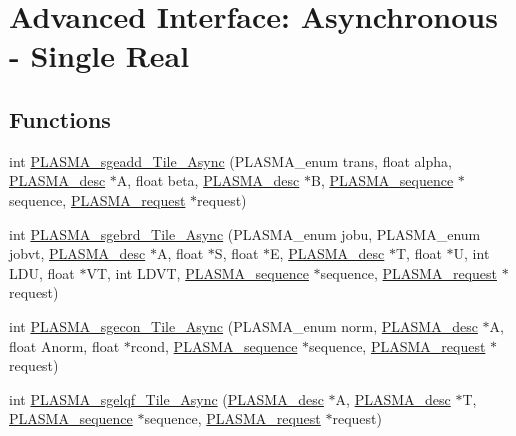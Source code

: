 \hypertarget{group__float__Tile__Async}{}\section{Advanced Interface\+: Asynchronous -\/ Single Real}
\label{group__float__Tile__Async}
\subsection*{Functions}
\begin{DoxyCompactItemize}
\item 
int \hyperlink{group__float__Tile__Async_gad88d429c19e2aec73ceda561df4666dd_gad88d429c19e2aec73ceda561df4666dd}{P\+L\+A\+S\+M\+A\+\_\+sgeadd\+\_\+\+Tile\+\_\+\+Async} (P\+L\+A\+S\+M\+A\+\_\+enum trans, float alpha, \hyperlink{structplasma__desc__t}{P\+L\+A\+S\+M\+A\+\_\+desc} $\ast$A, float beta, \hyperlink{structplasma__desc__t}{P\+L\+A\+S\+M\+A\+\_\+desc} $\ast$B, \hyperlink{structplasma__sequence__t}{P\+L\+A\+S\+M\+A\+\_\+sequence} $\ast$sequence, \hyperlink{structplasma__request__t}{P\+L\+A\+S\+M\+A\+\_\+request} $\ast$request)
\item 
int \hyperlink{group__float__Tile__Async_gae67c2111c450820663dc20c933c2703f_gae67c2111c450820663dc20c933c2703f}{P\+L\+A\+S\+M\+A\+\_\+sgebrd\+\_\+\+Tile\+\_\+\+Async} (P\+L\+A\+S\+M\+A\+\_\+enum jobu, P\+L\+A\+S\+M\+A\+\_\+enum jobvt, \hyperlink{structplasma__desc__t}{P\+L\+A\+S\+M\+A\+\_\+desc} $\ast$A, float $\ast$S, float $\ast$E, \hyperlink{structplasma__desc__t}{P\+L\+A\+S\+M\+A\+\_\+desc} $\ast$T, float $\ast$U, int L\+D\+U, float $\ast$V\+T, int L\+D\+V\+T, \hyperlink{structplasma__sequence__t}{P\+L\+A\+S\+M\+A\+\_\+sequence} $\ast$sequence, \hyperlink{structplasma__request__t}{P\+L\+A\+S\+M\+A\+\_\+request} $\ast$request)
\item 
int \hyperlink{group__float__Tile__Async_gaaa8291aabe6b837154fba55481a8fdd1_gaaa8291aabe6b837154fba55481a8fdd1}{P\+L\+A\+S\+M\+A\+\_\+sgecon\+\_\+\+Tile\+\_\+\+Async} (P\+L\+A\+S\+M\+A\+\_\+enum norm, \hyperlink{structplasma__desc__t}{P\+L\+A\+S\+M\+A\+\_\+desc} $\ast$A, float Anorm, float $\ast$rcond, \hyperlink{structplasma__sequence__t}{P\+L\+A\+S\+M\+A\+\_\+sequence} $\ast$sequence, \hyperlink{structplasma__request__t}{P\+L\+A\+S\+M\+A\+\_\+request} $\ast$request)
\item 
int \hyperlink{group__float__Tile__Async_ga66c68c7a249b7528c5cf086a44f27586_ga66c68c7a249b7528c5cf086a44f27586}{P\+L\+A\+S\+M\+A\+\_\+sgelqf\+\_\+\+Tile\+\_\+\+Async} (\hyperlink{structplasma__desc__t}{P\+L\+A\+S\+M\+A\+\_\+desc} $\ast$A, \hyperlink{structplasma__desc__t}{P\+L\+A\+S\+M\+A\+\_\+desc} $\ast$T, \hyperlink{structplasma__sequence__t}{P\+L\+A\+S\+M\+A\+\_\+sequence} $\ast$sequence, \hyperlink{structplasma__request__t}{P\+L\+A\+S\+M\+A\+\_\+request} $\ast$request)

\end{DoxyCompactItemize}
